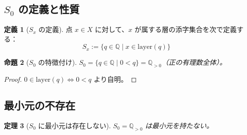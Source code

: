 \documentclass[a4paper,11pt]{ltjsarticle}
\theoremstyle{definition}
\newtheorem{definition}{定義}[section]
\theoremstyle{plain}
\newtheorem{theorem}[definition]{定理}
\newtheorem{proposition}[definition]{命題}
\theoremstyle{remark}
\newcommand{\Q}{\mathbb{Q}}
\newcommand{\Layer}{\mathrm{layer}}
\begin{document}
\subsection{$S_0$ の定義と性質}

\begin{definition}[$S_x$ の定義]
点 $x \in X$ に対して、$x$ が属する層の添字集合を次で定義する：
\[
    S_x := \{q \in \Q \mid x \in \Layer(q)\}
\]
\end{definition}

\begin{proposition}[$S_0$ の特徴付け]
$S_0 = \{q \in \Q \mid 0 < q\} = \Q_{>0}$（正の有理数全体）。
\end{proposition}

\begin{proof}
$0 \in \Layer(q) \Leftrightarrow 0 < q$ より自明。
\end{proof}

\subsection{最小元の不存在}

\begin{theorem}[$S_0$ に最小元は存在しない]\label{thm:no-least}
$S_0 = \Q_{>0}$ は最小元を持たない。
\end{theorem}
\end{document}
